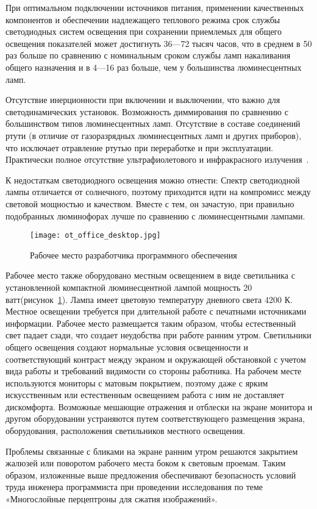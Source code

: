 При оптимальном подключении источников питания, применении качественных компонентов и обеспечении надлежащего теплового режима срок службы светодиодных систем освещения при сохранении приемлемых для общего освещения показателей может достигнуть 36—72 тысяч часов, что в среднем в 50 раз больше по сравнению с номинальным сроком службы ламп накаливания общего назначения и в 4—16 раз больше, чем у большинства люминесцентных ламп.

Отсутствие инерционности при включении и выключении, что важно для светодинамических установок.
Возможность диммирования по сравнению с большинством типов люминесцентных ламп.
Отсутствие в составе соединений ртути (в отличие от газоразрядных люминесцентных ламп и других приборов), что исключает отравление ртутью при переработке и при эксплуатации.
Практически полное отсутствие ультрафиолетового и инфракрасного излучения~\cite{ot_russia_encyclopedia}.

К недостаткам светодиодного освещения можно отнести: Спектр светодиодной лампы отличается от солнечного, поэтому приходится идти на компромисс между световой мощностью и качеством. Вместе с тем, он зачастую, при правильно подобранных люминофорах лучше по сравнению с люминесцентными лампами.

\begin{figure}[ht]
\centering
  \texttt{[image: ot\_office\_desktop.jpg]}
  \caption{ Рабочее место разработчика программного обеспечения}
  \label{fig:office_desktop}
\end{figure}

Рабочее место также оборудовано местным освещением в виде светильника с установленной компактной люминесцентной лампой мощность 20 ватт(рисунок~\ref{fig:office_desktop}).
Лампа имеет цветовую температуру дневного света 4200 К.
Местное освещении требуется при длительной работе с печатными источниками информации.
Рабочее место размещается таким образом, чтобы естественный свет падает сзади, что создает неудобства при работе ранним утром.
Светильники общего освещения создают нормальные условия освещенности и соответствующий контраст между экраном и окружающей обстановкой с учетом вида работы и требований видимости со стороны работника.
На рабочем месте используются мониторы с матовым покрытием, поэтому даже с ярким искусственным или естественным освещением работа с ним не доставляет дискомфорта.
Возможные мешающие отражения и отблески на экране монитора и другом оборудовании устраняются путем соответствующего размещения экрана, оборудования, расположения светильников местного освещения.

Проблемы связанные с бликами на экране ранним утром решаются закрытием жалюзей или поворотом рабочего места боком к световым проемам.
Таким образом, изложенные выше предложения обеспечивают безопасность условий труда инженера программиста при проведении исследования по теме «Многослойные перцептроны для сжатия изображений».
